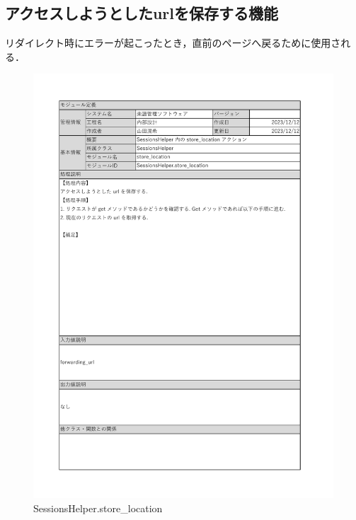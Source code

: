 \subsection*{アクセスしようとしたurlを保存する機能}
リダイレクト時にエラーが起こったとき，直前のページへ戻るために使用される．
\begin{figure}[H]
    \centering
    \includegraphics[scale=0.5]{img/Helper/SessionsHelper_store_location.pdf}
    \caption{SessionsHelper.store\_location}
\end{figure}
\clearpage

